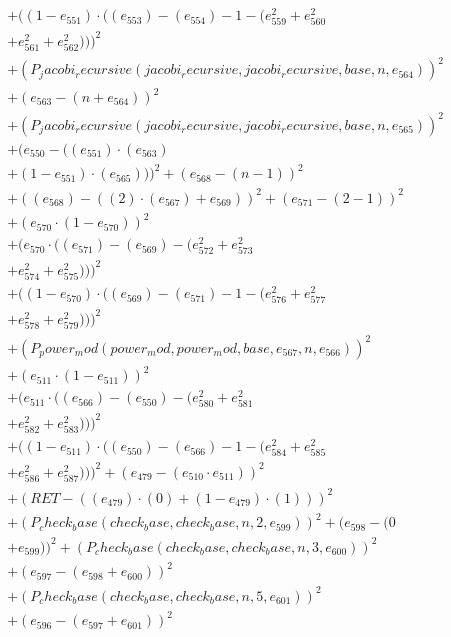 \documentclass[10pt, a4paper]{article}
\begin{document}
\begin{small}
\begin{align*}
& + ((1 - e_{551})  \cdot  ((e_{553}) - (e_{554}) - 1 - (e_{559}^{2} + e_{560}^{2} \\
& + e_{561}^{2} + e_{562}^{2})))^{2} \\
& + (P_jacobi_recursive(jacobi_recursive, jacobi_recursive, base, n, e_{564}))^{2} \\
& + (e_{563} - (n + e_{564}))^{2} \\
& + (P_jacobi_recursive(jacobi_recursive, jacobi_recursive, base, n, e_{565}))^{2} \\
& + (e_{550} - ((e_{551})  \cdot  (e_{563}) \\
& + (1 - e_{551})  \cdot  (e_{565})))^{2} + (e_{568} - (n - 1))^{2} \\
& + ((e_{568}) - ((2)  \cdot  (e_{567}) + e_{569}))^{2} + (e_{571} - (2 - 1))^{2} \\
& + (e_{570}  \cdot  (1 - e_{570}))^{2} \\
& + (e_{570}  \cdot  ((e_{571}) - (e_{569}) - (e_{572}^{2} + e_{573}^{2} \\
& + e_{574}^{2} + e_{575}^{2})))^{2} \\
& + ((1 - e_{570})  \cdot  ((e_{569}) - (e_{571}) - 1 - (e_{576}^{2} + e_{577}^{2} \\
& + e_{578}^{2} + e_{579}^{2})))^{2} \\
& + (P_power_mod(power_mod, power_mod, base, e_{567}, n, e_{566}))^{2} \\
& + (e_{511}  \cdot  (1 - e_{511}))^{2} \\
& + (e_{511}  \cdot  ((e_{566}) - (e_{550}) - (e_{580}^{2} + e_{581}^{2} \\
& + e_{582}^{2} + e_{583}^{2})))^{2} \\
& + ((1 - e_{511})  \cdot  ((e_{550}) - (e_{566}) - 1 - (e_{584}^{2} + e_{585}^{2} \\
& + e_{586}^{2} + e_{587}^{2})))^{2} + (e_{479} - (e_{510}  \cdot  e_{511}))^{2} \\
& + (RET - ((e_{479})  \cdot  (0) + (1 - e_{479})  \cdot  (1)))^{2} \\
& + (P_check_base(check_base, check_base, n, 2, e_{599}))^{2} + (e_{598} - (0 \\
& + e_{599}))^{2} + (P_check_base(check_base, check_base, n, 3, e_{600}))^{2} \\
& + (e_{597} - (e_{598} + e_{600}))^{2} \\
& + (P_check_base(check_base, check_base, n, 5, e_{601}))^{2} \\
& + (e_{596} - (e_{597} + e_{601}))^{2} \\

\end{align*}
\end{small}
\end{document}
